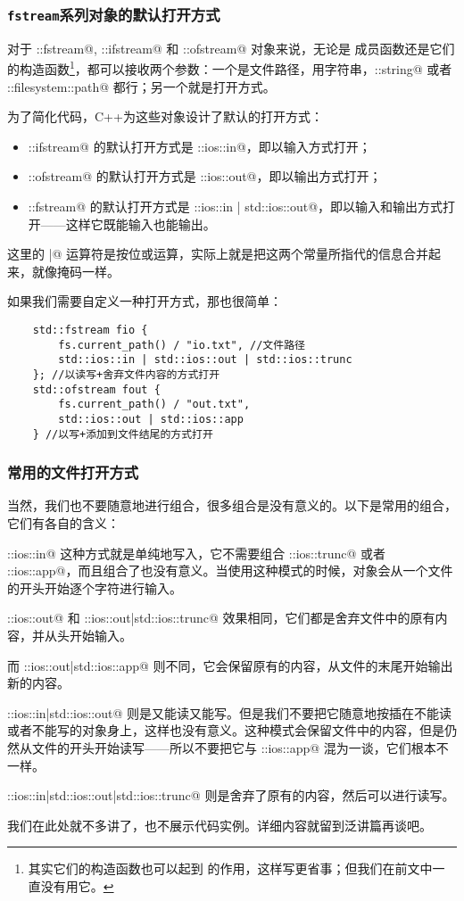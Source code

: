 \subsubsection*{\texttt{fstream}系列对象的默认打开方式}
对于 \lstinline@std::fstream@, \lstinline@std::ifstream@ 和 \lstinline@std::ofstream@ 对象来说，无论是 \lstinline@open@ 成员函数还是它们的构造函数\footnote{其实它们的构造函数也可以起到 \lstinline@open@ 的作用，这样写更省事；但我们在前文中一直没有用它。}，都可以接收两个参数：一个是文件路径，用字符串，\lstinline@std::string@ 或者 \lstinline@std::filesystem::path@ 都行；另一个就是打开方式。\par
为了简化代码，C++为这些对象设计了默认的打开方式：
\begin{itemize}
    \item \lstinline@std::ifstream@ 的默认打开方式是 \lstinline@std::ios::in@，即以输入方式打开；
    \item \lstinline@std::ofstream@ 的默认打开方式是 \lstinline@std::ios::out@，即以输出方式打开；
    \item \lstinline@std::fstream@ 的默认打开方式是 \lstinline@std::ios::in | std::ios::out@，即以输入和输出方式打开——这样它既能输入也能输出。
\end{itemize}
这里的 \lstinline@|@ 运算符是按位或运算，实际上就是把这两个常量所指代的信息合并起来，就像掩码一样。\par\pagebreak
如果我们需要自定义一种打开方式，那也很简单：
\begin{lstlisting}
    std::fstream fio {
        fs.current_path() / "io.txt", //文件路径
        std::ios::in | std::ios::out | std::ios::trunc
    }; //以读写+舍弃文件内容的方式打开
    std::ofstream fout {
        fs.current_path() / "out.txt",
        std::ios::out | std::ios::app
    } //以写+添加到文件结尾的方式打开
\end{lstlisting}\par
\subsubsection*{常用的文件打开方式}
当然，我们也不要随意地进行组合，很多组合是没有意义的。以下是常用的组合，它们有各自的含义：\par
\lstinline@std::ios::in@ 这种方式就是单纯地写入，它不需要组合 \lstinline@std::ios::trunc@ 或者 \lstinline@std::ios::app@，而且组合了也没有意义。当使用这种模式的时候，对象会从一个文件的开头开始逐个字符进行输入。\par
\lstinline@std::ios::out@ 和 \lstinline@std::ios::out|std::ios::trunc@ 效果相同，它们都是舍弃文件中的原有内容，并从头开始输入。\par
而 \lstinline@std::ios::out|std::ios::app@ 则不同，它会保留原有的内容，从文件的末尾开始输出新的内容。\par
\lstinline@std::ios::in|std::ios::out@ 则是又能读又能写。但是我们不要把它随意地按插在不能读或者不能写的对象身上，这样也没有意义。这种模式会保留文件中的内容，但是仍然从文件的开头开始读写——所以不要把它与 \lstinline@std::ios::app@ 混为一谈，它们根本不一样。\par
\lstinline@std::ios::in|std::ios::out|std::ios::trunc@ 则是舍弃了原有的内容，然后可以进行读写。\par
我们在此处就不多讲了，也不展示代码实例。详细内容就留到泛讲篇再谈吧。\par
